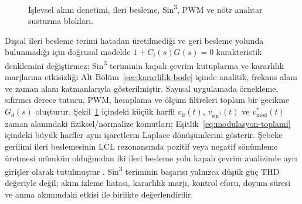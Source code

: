 \begin{figure}[H]
{%
  }
  \caption{İşlevsel akım denetimi, ileri besleme, Sin\textsuperscript{3}, PWM ve nötr anahtar susturma blokları.}
  \label{fig:denetim-modulasyon-blok}
\end{figure}

Dışsal ileri besleme terimi hatadan üretilmediği ve geri besleme yolunda bulunmadığı için doğrusal modelde $1+C_i(s)G(s)=0$ karakteristik denklemini değiştirmez; Sin\textsuperscript{3} teriminin kapalı çevrim kutuplarına ve kararlılık marjlarına etkisizliği Alt Bölüm~\ref{sec:kararlilik-bode} içinde analitik, frekans alanı ve zaman alanı katmanlarıyla gösterilmiştir. Sayısal uygulamada örnekleme, sıfırıncı derece tutucu, PWM, hesaplama ve ölçüm filtreleri toplam bir gecikme $G_d(s)$ oluşturur. Şekil~\ref{fig:denetim-modulasyon-blok} içindeki küçük harfli $v_{\mathrm{ff}}(t)$, $v_{\sin^3}(t)$ ve $v_{\mathrm{mod}}^{\ast}(t)$ zaman alanındaki fiziksel/normalize komutları; Eşitlik~\eqref{eq:modulasyon-toplami} içindeki büyük harfler aynı işaretlerin Laplace dönüşümlerini gösterir. Şebeke gerilimi ileri beslemesinin LCL rezonansında pozitif veya negatif sönümleme üretmesi mümkün olduğundan iki ileri besleme yolu kapalı çevrim analizinde ayrı girişler olarak tutulmuştur \citep{Lu2016,Wang2024}. Sin\textsuperscript{3} teriminin başarısı yalnızca düşük güç THD değeriyle değil; akım izleme hatası, kararlılık marjı, kontrol eforu, doyum süresi ve anma akımındaki etkisi ile birlikte değerlendirilir.

